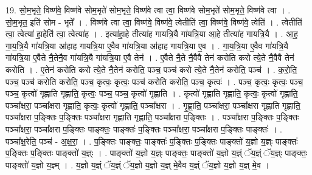 \documentclass[17pt]{extarticle}
\begin{document}
19. सो॒म॒भृते॒ विष्ण॑वे॒ विष्ण॑वे सोम॒भृते॑ सोम॒भृते॒ विष्ण॑वे त्वा त्वा॒ विष्ण॑वे सोम॒भृते॑ सोम॒भृते॒ विष्ण॑वे त्वा । . सो॒म॒भृत॒ इति॑ सोम - भृते᳚ । . विष्ण॑वे त्वा त्वा॒ विष्ण॑वे॒ विष्ण॑वे॒ त्वेतीति॑ त्वा॒ विष्ण॑वे॒ विष्ण॑वे॒ त्वेति॑ । . त्वेतीति॑ त्वा॒ त्वेत्या॑ हा॒हेति॑ त्वा॒ त्वेत्या॑ह । . इत्या॑हा॒हे तीत्या॑ह गायत्रि॒यै गा॑यत्रि॒या आ॒हे तीत्या॑ह गायत्रि॒यै । . आ॒ह॒ गा॒य॒त्रि॒यै गा॑यत्रि॒या आ॑हाह गायत्रि॒या ए॒वैव गा॑यत्रि॒या आ॑हाह गायत्रि॒या ए॒व । . गा॒य॒त्रि॒या ए॒वैव गा॑यत्रि॒यै गा॑यत्रि॒या ए॒वैते नै॒तेनै॒व गा॑यत्रि॒यै गा॑यत्रि॒या ए॒वै तेन॑ । . ए॒वैते नै॒ते नै॒वैवै तेन॑ करोति करो त्ये॒ते नै॒वैवै तेन॑ करोति । . ए॒तेन॑ करोति करो त्ये॒ते नै॒तेन॑ करोति॒ पञ्च॒ पञ्च॑ करो त्ये॒ते नै॒तेन॑ करोति॒ पञ्च॑ । . क॒रो॒ति॒ पञ्च॒ पञ्च॑ करोति करोति॒ पञ्च॒ कृत्वः॒ कृत्वः॒ पञ्च॑ करोति करोति॒ पञ्च॒ कृत्वः॑ । . पञ्च॒ कृत्वः॒ कृत्वः॒ पञ्च॒ पञ्च॒ कृत्वो॑ गृह्णाति गृह्णाति॒ कृत्वः॒ पञ्च॒ पञ्च॒ कृत्वो॑ गृह्णाति । . कृत्वो॑ गृह्णाति गृह्णाति॒ कृत्वः॒ कृत्वो॑ गृह्णाति॒ पञ्चा᳚क्षरा॒ पञ्चा᳚क्षरा गृह्णाति॒ कृत्वः॒ कृत्वो॑ गृह्णाति॒ पञ्चा᳚क्षरा । . गृ॒ह्णा॒ति॒ पञ्चा᳚क्षरा॒ पञ्चा᳚क्षरा गृह्णाति गृह्णाति॒ पञ्चा᳚क्षरा प॒ङ्क्तिः प॒ङ्क्तिः पञ्चा᳚क्षरा गृह्णाति गृह्णाति॒ पञ्चा᳚क्षरा प॒ङ्क्तिः । . पञ्चा᳚क्षरा प॒ङ्क्तिः प॒ङ्क्तिः पञ्चा᳚क्षरा॒ पञ्चा᳚क्षरा प॒ङ्क्तिः पाङ्क्तः॒ पाङ्क्तः॑ प॒ङ्क्तिः पञ्चा᳚क्षरा॒ पञ्चा᳚क्षरा प॒ङ्क्तिः पाङ्क्तः॑ । . पञ्चा᳚क्ष॒रेति॒ पञ्च॑ - अ॒क्ष॒रा॒ । . प॒ङ्क्तिः पाङ्क्तः॒ पाङ्क्तः॑ प॒ङ्क्तिः प॒ङ्क्तिः पाङ्क्तो॑ य॒ज्ञो य॒ज्ञ्ः पाङ्क्तः॑ प॒ङ्क्तिः प॒ङ्क्तिः पाङ्क्तो॑ य॒ज्ञ्ः । . पाङ्क्तो॑ य॒ज्ञो य॒ज्ञ्ः पाङ्क्तः॒ पाङ्क्तो॑ य॒ज्ञो य॒ज्ञ्ं ॅय॒ज्ञ्ं ॅय॒ज्ञ्ः पाङ्क्तः॒ पाङ्क्तो॑ य॒ज्ञो य॒ज्ञ्म् । . य॒ज्ञो य॒ज्ञ्ं ॅय॒ज्ञ्ं ॅय॒ज्ञो य॒ज्ञो य॒ज्ञ् मे॒वैव य॒ज्ञ्ं ॅय॒ज्ञो य॒ज्ञो य॒ज्ञ् मे॒व । \newline
\end{document}
